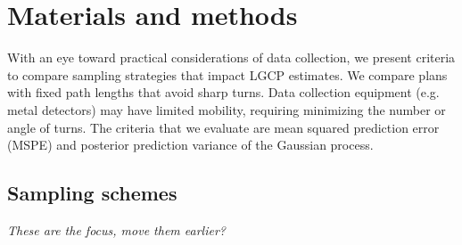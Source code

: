 \documentclass[review]{elsarticle}
\begin{document}


\section{Materials and methods}


With an eye toward practical considerations of data collection, we present
criteria to compare sampling strategies that impact LGCP estimates. We compare
plans with fixed path lengths that avoid sharp turns. Data collection equipment
(e.g. metal detectors) may have limited mobility, requiring minimizing the
number or angle of turns. The criteria that we evaluate are mean squared
prediction error (MSPE) and posterior prediction variance of the Gaussian
process.


\subsection{Sampling schemes}

{\it These are the focus, move them earlier?}
\end{document}
